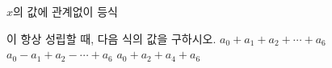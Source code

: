 $x$의 값에 관계없이 등식\par\smallskip{}\par\smallskip\noindent 이 항상 성립할 때, 다음 식의 값을 구하시오. 
 $a_0+a_1+a_2+\cdots+a_6$
 $a_0-a_1+a_2-\cdots+a_6$
 $a_0+a_2+a_4+a_6$
